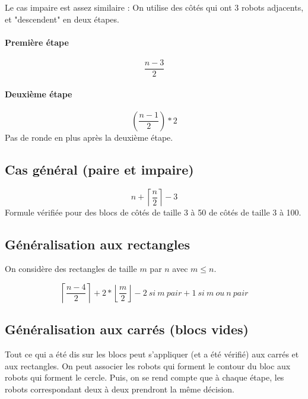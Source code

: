 \documentclass[11pt, a4paper]{article}
\theoremstyle{plain}
\theoremstyle{definition}
\theoremstyle{remark}
\begin{document}
Le cas impaire est assez similaire :
On utilise des côtés qui ont 3 robots adjacents, et "descendent" en deux
étapes.

\paragraph{Première étape}
\[ \frac{n-3}{2} \]

\paragraph{Deuxième étape}
\[ ( \frac{n-1}{2} ) *2 \]
Pas de ronde en plus après la deuxième étape.

\subsection{Cas général (paire et impaire)}
\[ n + \left\lceil \frac{n}{2} \right\rceil -3 \]
Formule vérifiée pour des blocs de côtés de taille 3 à 50 de côtés de taille 3
à 100.

\subsection{Généralisation aux rectangles}

On considère des rectangles de taille $m$ par $n$ avec $m \leq n$.

\[
    \left\lceil \frac{n-4}{2} \right\rceil
  + 2*\left\lfloor \frac{m}{2} \right\rfloor
  -2\ si\ m\ pair
  +1\ si\ m\ ou\ n\ pair
\]

\subsection{Généralisation aux carrés (blocs vides)}

Tout ce qui a été dis sur les blocs peut s'appliquer (et a été vérifié) aux
carrés et aux rectangles. On peut associer les robots qui forment le contour du
bloc aux robots qui forment le cercle. Puis, on se rend compte que à chaque
étape, les robots correspondant deux à deux prendront la même décision.
\end{document}

